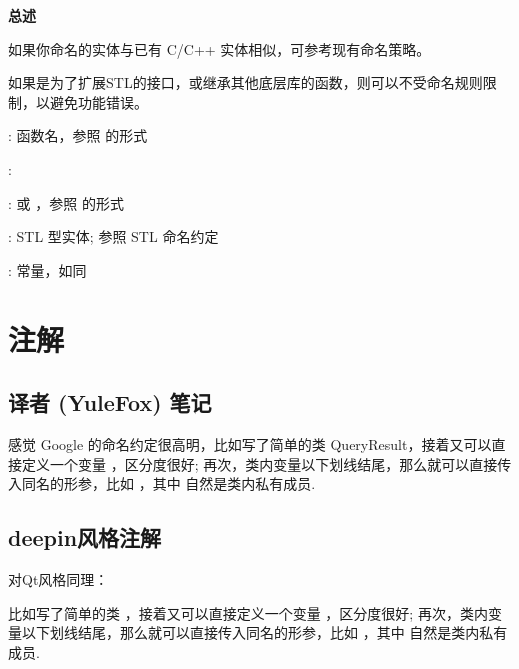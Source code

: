 \textbf{总述}

如果你命名的实体与已有 C/C++ 实体相似，可参考现有命名策略。

\begin{DWarn}
  如果是为了扩展STL的接口，或继承其他底层库的函数，则可以不受命名规则限制，以避免功能错误。
\end{DWarn}

: 函数名，参照  的形式

: 

:  或 ，参照  的形式

: STL 型实体; 参照 STL 命名约定

: 常量，如同 

\section{注解}

\subsection{ 译者 (YuleFox) 笔记}

感觉 Google 的命名约定很高明，比如写了简单的类 QueryResult，接着又可以直接定义一个变量 ，区分度很好; 再次，类内变量以下划线结尾，那么就可以直接传入同名的形参，比如  ，其中  自然是类内私有成员.

\subsection{ deepin风格注解 }

对Qt风格同理：

比如写了简单的类 ，接着又可以直接定义一个变量 ，区分度很好; 再次，类内变量以下划线结尾，那么就可以直接传入同名的形参，比如  ，其中  自然是类内私有成员.

